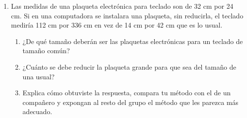 \documentclass[11pt]{book}
\begin{document}
\begin{enumerate}
  \item Las medidas de una plaqueta electrónica para teclado son de 32 cm por 24 cm. Si
        en una computadora se instalara una plaqueta, sin reducirla, el teclado mediría
        112 cm por 336 cm en vez de 14 cm por 42 cm que es lo usual.
        \begin{enumerate}
          \item ¿De qué tamaño deberán ser las plaquetas electrónicas para un teclado de tamaño común?
          \item ¿Cuánto se debe reducir la plaqueta grande para que sea del tamaño de una usual?
          \item Explica cómo obtuviste la respuesta, compara tu método con el de un compañero
                y expongan al resto del grupo el método que les parezca más adecuado.
        \end{enumerate}


\end{enumerate}
\end{document}
